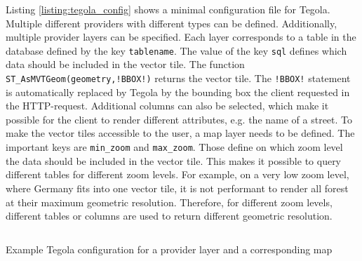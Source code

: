 \documentclass[conference]{IEEEtran}
\begin{document}
Listing \ref{listing:tegola_config} shows a minimal configuration file for Tegola. Multiple different providers with different types can be defined. Additionally, multiple provider layers can be specified. Each layer corresponds to a table in the database defined by the key \texttt{tablename}. The value of the key \texttt{sql} defines which data should be included in the vector tile. The function \texttt{ST\_AsMVTGeom(geometry,!BBOX!)} returns the vector tile. The \texttt{!BBOX!} statement is automatically replaced by Tegola by the bounding box the client requested in the HTTP-request. Additional columns can also be selected, which make it possible for the client to render different attributes, e.g. the name of a street. To make the vector tiles accessible to the user, a map layer needs to be defined. The important keys are \texttt{min\_zoom} and \texttt{max\_zoom}. Those define on which zoom level the data should be included in the vector tile. This makes it possible to query different tables for different zoom levels. 
For example, on a very low zoom level, where Germany fits into one vector tile, it is not performant to render all forest at their maximum geometric resolution. Therefore, for different zoom levels, different tables or columns are used to return different geometric resolution.

\begin{listing}[h]
    \inputminted[tabsize=2, fontsize=\footnotesize]{python}{listings/tegola.toml}
    \caption{Example Tegola configuration for a provider layer and a corresponding map}
    \label{listing:tegola_config}
\end{listing}
\end{document}

